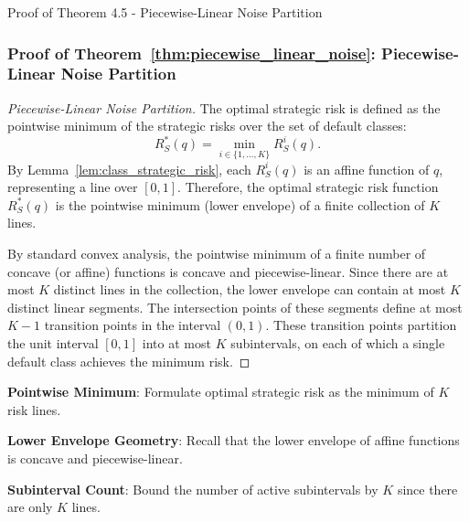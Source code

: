 \begin{sourceblock}{Proof of Theorem 4.5 - Piecewise-Linear Noise Partition}
\subsubsection*{Proof of Theorem~\ref{thm:piecewise_linear_noise}: Piecewise-Linear Noise Partition}
\label{app:proof_piecewise_linear_noise}
\begin{proof}[Piecewise-Linear Noise Partition]
The optimal strategic risk is defined as the pointwise minimum of the strategic risks over the set of default classes:
\begin{equation}
    R^*_S(q) = \min_{i \in \{1, \dots, K\}} R^i_S(q).
\end{equation}
By Lemma~\ref{lem:class_strategic_risk}, each $R^i_S(q)$ is an affine function of $q$, representing a line over $[0, 1]$. Therefore, the optimal strategic risk function $R^*_S(q)$ is the pointwise minimum (lower envelope) of a finite collection of $K$ lines.

By standard convex analysis, the pointwise minimum of a finite number of concave (or affine) functions is concave and piecewise-linear. 
Since there are at most $K$ distinct lines in the collection, the lower envelope can contain at most $K$ distinct linear segments. The intersection points of these segments define at most $K - 1$ transition points in the interval $(0, 1)$. These transition points partition the unit interval $[0, 1]$ into at most $K$ subintervals, on each of which a single default class achieves the minimum risk.
\end{proof}
\end{sourceblock}

\begin{guideblock}
\item \textbf{Pointwise Minimum}: Formulate optimal strategic risk as the minimum of $K$ risk lines.
\item \textbf{Lower Envelope Geometry}: Recall that the lower envelope of affine functions is concave and piecewise-linear.
\item \textbf{Subinterval Count}: Bound the number of active subintervals by $K$ since there are only $K$ lines.
\end{guideblock}


